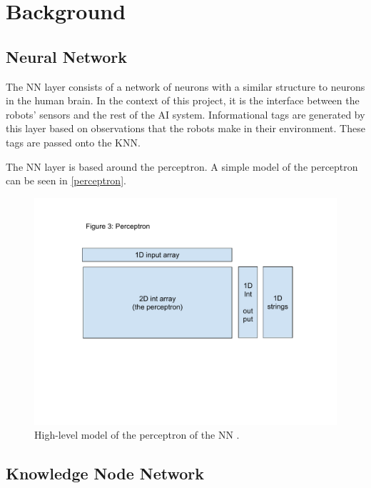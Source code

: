 \documentclass[titlepage,11pt]{article}
\newcommand{\ar}[1]{\autoref{#1}}
\begin{document}
\section{Background}
\label{sec:background}

\subsection{Neural Network}


The NN layer consists of a network of neurons with a similar structure to neurons in the human brain. In the context of this project, it is the interface between the robots' sensors and the rest of the AI system. Informational tags are generated by this layer based on observations that the robots make in their environment. These tags are passed onto the KNN.

The NN layer is based around the perceptron. A simple model of the perceptron can be seen in \ar{perceptron}.

\begin{figure}[!htb]
	\includegraphics[width=\columnwidth]{figures/perceptron.pdf}
	\caption[High-level model of the perceptron of the NN.]
	{High-level model of the perceptron of the NN \cite{vybihal-perceptron}.}
	\label{perceptron}
\end{figure}

\subsection{Knowledge Node Network}
\end{document}

